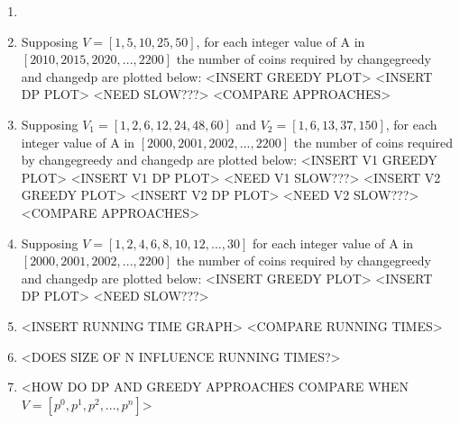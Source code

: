 \documentclass[paper=a4, fontsize=11pt]{scrartcl} %
\numberwithin{equation}{section} %
\numberwithin{figure}{section} %
\numberwithin{table}{section} %
\begin{document}
\begin{enumerate}
    \item <Proof of correctness of dynamic programming approach>
    
    \item Supposing $V = [1, 5, 10, 25, 50]$, for each integer value of A in $[2010, 2015, 2020, ..., 2200]$ the number of coins required by changegreedy and changedp are plotted below: <INSERT GREEDY PLOT> <INSERT DP PLOT> <NEED SLOW???> <COMPARE APPROACHES>
    
    \item Supposing $V_1 = [1, 2, 6, 12, 24, 48, 60]$ and $V_2 = [1, 6, 13, 37, 150]$, for each integer value of A in $[2000, 2001, 2002, ..., 2200]$ the number of coins required by changegreedy and changedp are plotted below: <INSERT V1 GREEDY PLOT> <INSERT V1 DP PLOT> <NEED V1 SLOW???> <INSERT V2 GREEDY PLOT> <INSERT V2 DP PLOT> <NEED V2 SLOW???> <COMPARE APPROACHES>
    
    \item Supposing $V = [1, 2, 4, 6, 8, 10, 12, ..., 30]$ for each integer value of A in $[2000, 2001, 2002, ..., 2200]$ the number of coins required by changegreedy and changedp are plotted below: <INSERT GREEDY PLOT> <INSERT DP PLOT> <NEED SLOW???>
    
    \item <INSERT TREND LINE EQUATIONS AND FIND RUNTIME> <INSERT RUNNING TIME GRAPH> <COMPARE RUNNING TIMES>
    
    \item <PLOT RUNNING TIMES AS FUNCTION OF NUMBER OF DENOMINATIONS> <DOES SIZE OF N INFLUENCE RUNNING TIMES?>
    
    \item <HOW DO DP AND GREEDY APPROACHES COMPARE WHEN $V = [p^0, p^1, p^2, ..., p^n]$>
\end{enumerate}
\end{document}
